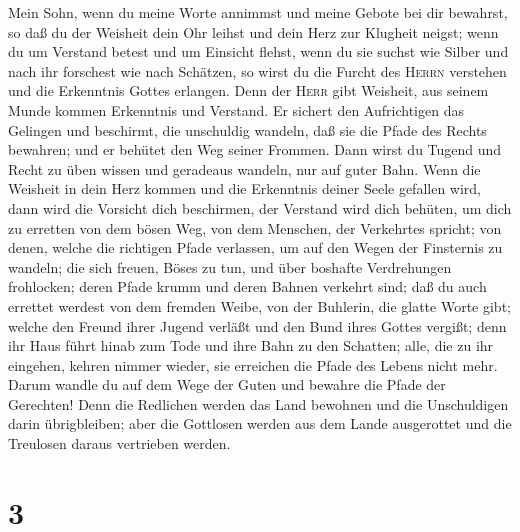  Mein Sohn, wenn du meine Worte annimmst und meine Gebote
bei dir bewahrst,  so daß du der Weisheit dein Ohr leihst
und dein Herz zur Klugheit neigst;  wenn du um Verstand
betest und um Einsicht flehst,  wenn du sie suchst wie
Silber und nach ihr forschest wie nach Schätzen,  so wirst
du die Furcht des \textsc{Herrn} verstehen und die Erkenntnis Gottes
erlangen.  Denn der \textsc{Herr} gibt Weisheit, aus
seinem Munde kommen Erkenntnis und Verstand.  Er sichert
den Aufrichtigen das Gelingen und beschirmt, die unschuldig wandeln,
 daß sie die Pfade des Rechts bewahren; und er behütet den
Weg seiner Frommen.  Dann wirst du Tugend und Recht zu
üben wissen und geradeaus wandeln, nur auf guter Bahn. 
Wenn die Weisheit in dein Herz kommen und die Erkenntnis deiner Seele
gefallen wird,  dann wird die Vorsicht dich beschirmen,
der Verstand wird dich behüten,  um dich zu erretten von
dem bösen Weg, von dem Menschen, der Verkehrtes spricht; 
von denen, welche die richtigen Pfade verlassen, um auf den Wegen der
Finsternis zu wandeln;  die sich freuen, Böses zu tun,
und über boshafte Verdrehungen frohlocken;  deren Pfade
krumm und deren Bahnen verkehrt sind;  daß du auch
errettet werdest von dem fremden Weibe, von der Buhlerin, die glatte
Worte gibt;  welche den Freund ihrer Jugend verläßt und
den Bund ihres Gottes vergißt;  denn ihr Haus führt hinab
zum Tode und ihre Bahn zu den Schatten;  alle, die zu ihr
eingehen, kehren nimmer wieder, sie erreichen die Pfade des Lebens nicht
mehr.  Darum wandle du auf dem Wege der Guten und bewahre
die Pfade der Gerechten!  Denn die Redlichen werden das
Land bewohnen und die Unschuldigen darin übrigbleiben; 
aber die Gottlosen werden aus dem Lande ausgerottet und die Treulosen
daraus vertrieben werden.

\hypertarget{section-2}{%
\section{3}\label{section-2}}

